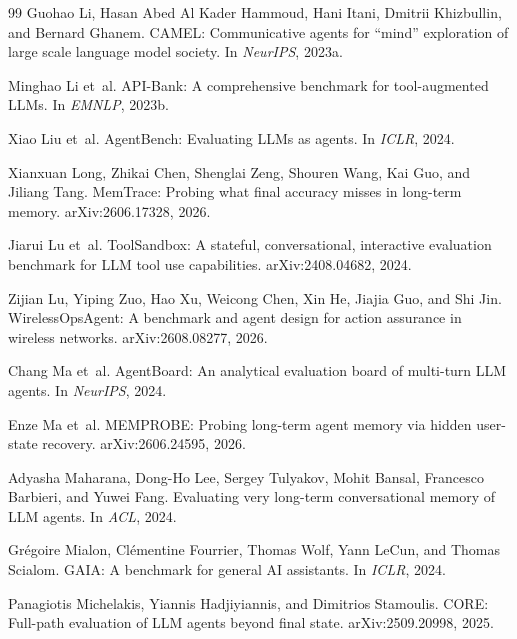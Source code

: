 \documentclass[11pt]{article}
\begin{document}
\begin{thebibliography}{99}
Guohao Li, Hasan Abed Al Kader Hammoud, Hani Itani, Dmitrii Khizbullin, and Bernard Ghanem.
\newblock CAMEL: Communicative agents for ``mind'' exploration of large scale language model society.
\newblock In \emph{NeurIPS}, 2023a.

Minghao Li et~al.
\newblock API-Bank: A comprehensive benchmark for tool-augmented LLMs.
\newblock In \emph{EMNLP}, 2023b.

Xiao Liu et~al.
\newblock AgentBench: Evaluating LLMs as agents.
\newblock In \emph{ICLR}, 2024.

Xianxuan Long, Zhikai Chen, Shenglai Zeng, Shouren Wang, Kai Guo, and Jiliang Tang.
\newblock MemTrace: Probing what final accuracy misses in long-term memory.
\newblock arXiv:2606.17328, 2026.

Jiarui Lu et~al.
\newblock ToolSandbox: A stateful, conversational, interactive evaluation benchmark for LLM tool use capabilities.
\newblock arXiv:2408.04682, 2024.

Zijian Lu, Yiping Zuo, Hao Xu, Weicong Chen, Xin He, Jiajia Guo, and Shi Jin.
\newblock WirelessOpsAgent: A benchmark and agent design for action assurance in wireless networks.
\newblock arXiv:2608.08277, 2026.

Chang Ma et~al.
\newblock AgentBoard: An analytical evaluation board of multi-turn LLM agents.
\newblock In \emph{NeurIPS}, 2024.

Enze Ma et~al.
\newblock MEMPROBE: Probing long-term agent memory via hidden user-state recovery.
\newblock arXiv:2606.24595, 2026.

Adyasha Maharana, Dong-Ho Lee, Sergey Tulyakov, Mohit Bansal, Francesco Barbieri, and Yuwei Fang.
\newblock Evaluating very long-term conversational memory of LLM agents.
\newblock In \emph{ACL}, 2024.

Grégoire Mialon, Clémentine Fourrier, Thomas Wolf, Yann LeCun, and Thomas Scialom.
\newblock GAIA: A benchmark for general AI assistants.
\newblock In \emph{ICLR}, 2024.

Panagiotis Michelakis, Yiannis Hadjiyiannis, and Dimitrios Stamoulis.
\newblock CORE: Full-path evaluation of LLM agents beyond final state.
\newblock arXiv:2509.20998, 2025.


\end{thebibliography}
\end{document}
